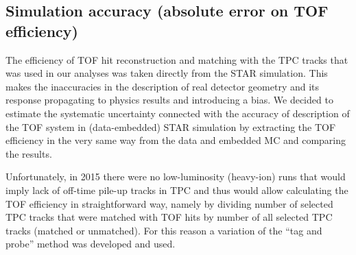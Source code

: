 \subsection{Simulation accuracy (absolute error on TOF efficiency)}

The efficiency of TOF hit reconstruction and matching with the TPC tracks that was used in our analyses was taken directly from the STAR simulation. This makes the inaccuracies in the description of real detector geometry and its response propagating to physics results and introducing a bias. We decided to estimate the systematic uncertainty connected with the accuracy of description of the TOF system in (data-embedded) STAR simulation by extracting the TOF efficiency in the very same way from the data and embedded MC and comparing the results.

Unfortunately, in 2015 there were no low-luminosity (heavy-ion) runs that would imply lack of off-time pile-up tracks in TPC and thus would allow calculating the TOF efficiency in straightforward way, namely by dividing number of selected TPC tracks that were matched with TOF hits by number of all selected TPC tracks (matched or unmatched). For this reason a variation of the ``tag and probe'' method was developed and used.

